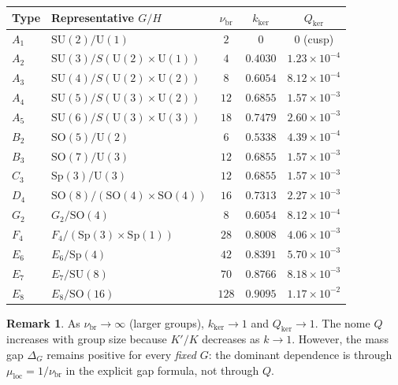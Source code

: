 \documentclass[12pt]{article}
\theoremstyle{plain}
\theoremstyle{definition}
\newtheorem{remark}[theorem]{Remark}
\numberwithin{equation}{section}
\newcommand{\loc}{\mathrm{loc}}
\newcommand{\br}{\mathrm{br}}
\newcommand{\kker}{\mathrm{ker}}
\begin{document}
\begin{center}
\begin{tabular}{llccc}
\toprule
Type & Representative $G/H$ & $\nu_{\br}$ & $k_{\kker}$ & $Q_{\kker}$\\
\midrule
$A_1$ & $\mathrm{SU}(2)/\mathrm{U}(1)$ & $2$ & $0$ & $0$ (cusp)\\
$A_2$ & $\mathrm{SU}(3)/S(\mathrm{U}(2)\times\mathrm{U}(1))$ & $4$ & $0.4030$ & $1.23\times10^{-4}$\\
$A_3$ & $\mathrm{SU}(4)/S(\mathrm{U}(2)\times\mathrm{U}(2))$ & $8$ & $0.6054$ & $8.12\times10^{-4}$\\
$A_4$ & $\mathrm{SU}(5)/S(\mathrm{U}(3)\times\mathrm{U}(2))$ & $12$ & $0.6855$ & $1.57\times10^{-3}$\\
$A_5$ & $\mathrm{SU}(6)/S(\mathrm{U}(3)\times\mathrm{U}(3))$ & $18$ & $0.7479$ & $2.60\times10^{-3}$\\
$B_2$ & $\mathrm{SO}(5)/\mathrm{U}(2)$ & $6$ & $0.5338$ & $4.39\times10^{-4}$\\
$B_3$ & $\mathrm{SO}(7)/\mathrm{U}(3)$ & $12$ & $0.6855$ & $1.57\times10^{-3}$\\
$C_3$ & $\mathrm{Sp}(3)/\mathrm{U}(3)$ & $12$ & $0.6855$ & $1.57\times10^{-3}$\\
$D_4$ & $\mathrm{SO}(8)/(\mathrm{SO}(4)\times\mathrm{SO}(4))$ & $16$ & $0.7313$ & $2.27\times10^{-3}$\\
$G_2$ & $G_2/\mathrm{SO}(4)$ & $8$ & $0.6054$ & $8.12\times10^{-4}$\\
$F_4$ & $F_4/(\mathrm{Sp}(3)\times\mathrm{Sp}(1))$ & $28$ & $0.8008$ & $4.06\times10^{-3}$\\
$E_6$ & $E_6/\mathrm{Sp}(4)$ & $42$ & $0.8391$ & $5.70\times10^{-3}$\\
$E_7$ & $E_7/\mathrm{SU}(8)$ & $70$ & $0.8766$ & $8.18\times10^{-3}$\\
$E_8$ & $E_8/\mathrm{SO}(16)$ & $128$ & $0.9095$ & $1.17\times10^{-2}$\\
\bottomrule
\end{tabular}
\end{center}

\begin{remark}
As $\nu_{\br}\to\infty$ (larger groups), $k_{\kker}\to 1$ and $Q_{\kker}\to 1$.  The nome $Q$ increases with group size because $K'/K$ decreases as $k\to 1$.  However, the mass gap $\Delta_G$ remains positive for every \emph{fixed} $G$: the dominant dependence is through $\mu_{\loc}=1/\nu_{\br}$ in the explicit gap formula, not through $Q$.
\end{remark}
\end{document}
